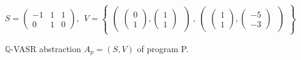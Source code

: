 
\begin{figure}
\[
    S = \begin{pmatrix}
        -1 & 1 & 1 \\
        0 & 1 & 0
    \end{pmatrix}, \ \
    V = \begin{Bmatrix}
        \begin{pmatrix}
              \begin{pmatrix}
                    0 \\
                    1
               \end{pmatrix},
               \begin{pmatrix}
                     1 \\
                     1
               \end{pmatrix}
        \  \end{pmatrix}\ , \
        \begin{pmatrix}
               \begin{pmatrix}
                    1 \\
                    1
               \end{pmatrix},
               \begin{pmatrix}
                     -5 \\
                     -3
              \end{pmatrix}
        \ \end{pmatrix}
    \end{Bmatrix}
\]
\caption{$\mathbb{Q}$-VASR abstraction $A_p = (S, V)$ of program P.}
\end{figure}